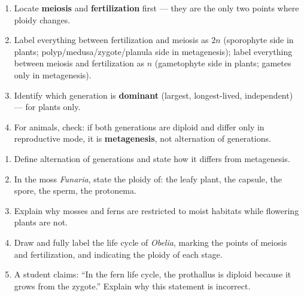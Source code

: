 \documentclass[11pt]{article}
\begin{document}
\begin{methode}
\begin{enumerate}
\item Locate \textbf{meiosis} and \textbf{fertilization} first — they are the only two points where ploidy changes.
\item Label everything between fertilization and meiosis as $2n$ (sporophyte side in plants; polyp/medusa/zygote/planula side in metagenesis); label everything between meiosis and fertilization as $n$ (gametophyte side in plants; gametes only in metagenesis).
\item Identify which generation is \textbf{dominant} (largest, longest-lived, independent) — for plants only.
\item For animals, check: if both generations are diploid and differ only in reproductive mode, it is \textbf{metagenesis}, not alternation of generations.
\end{enumerate}
\end{methode}

\begin{exercice}
\begin{enumerate}
\item Define alternation of generations and state how it differs from metagenesis.
\item In the moss \emph{Funaria}, state the ploidy of: the leafy plant, the capsule, the spore, the sperm, the protonema.
\item Explain why mosses and ferns are restricted to moist habitats while flowering plants are not.
\item Draw and fully label the life cycle of \emph{Obelia}, marking the points of meiosis and fertilization, and indicating the ploidy of each stage.
\item A student claims: ``In the fern life cycle, the prothallus is diploid because it grows from the zygote.'' Explain why this statement is incorrect.
\end{enumerate}
\end{exercice}
\end{document}
